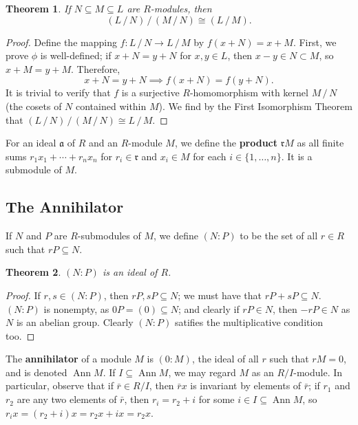 \documentclass[11pt]{article}
\newtheorem{theorem}{Theorem}
\newcommand{\Ann}{\operatorname{Ann}}
\begin{document}
\begin{adjustwidth}{1cm}{}
	\begin{theorem}
		If $N \subseteq M \subseteq L$ are $R$-modules, then
		\[
			(L \,/\, N) \,/\, (M \,/\, N) \cong (L \,/\, M).
		\]
	\end{theorem}
	\begin{proof}
		Define the mapping $f : L \,/\, N \to L \,/\, M$ by $f(x + N) = x + M$. First, we prove $\phi$ is well-defined; if $x + N = y + N$ for $x, y \in L$, then $x - y \in N \subset M$, so $x + M = y + M$. Therefore,
		\[
			x + N = y + N \implies f(x + N) = f(y + N).
		\]
		It is trivial to verify that $f$ is a surjective $R$-homomorphism with kernel $M \,/\, N$ (the cosets of $N$ contained within $M$). We find by the First Isomorphism Theorem that $(L \,/\, N) \,/\, (M \,/\, N) \cong L \,/\, M$.
	\end{proof}
\end{adjustwidth}

For an ideal $\mathfrak{a}$ of $R$ and an $R$-module $M$, we define the \textbf{product} $\mathfrak{r} M$ as all finite sums $r_{1}x_{1} + \cdots + r_{n}x_{n}$ for $r_{i} \in \mathfrak{r}$ and $x_{i} \in M$  for each $i \in \{ 1, \ldots, n \}$. It is a submodule of $M$.


\subsection{The Annihilator}

If $N$ and $P$ are $R$-submodules of $M$, we define $(N : P)$ to be the set of all $r \in R$ such that $rP \subseteq N$.

\begin{adjustwidth}{1cm}{}
	\begin{theorem}
		$(N : P)$ is an ideal of $R$.
	\end{theorem}
	\begin{proof}
		If $r, s \in (N : P)$, then $rP, sP \subseteq N$; we must have that $rP + sP \subseteq N$. $(N : P)$ is nonempty, as $0P = (0) \subseteq N$; and clearly if $rP \in N$, then $-rP \in N$ as $N$ is an abelian group. Clearly $(N : P)$ satifies the multiplicative condition too.
	\end{proof}
\end{adjustwidth}

The \textbf{annihilator} of a module $M$ is $(0 : M)$, the ideal of all $r$ such that $rM = 0$, and is denoted $\Ann M$. If $I \subseteq \Ann M$, we may regard $M$ as an $R / I$-module. In particular, observe that if $\bar{r} \in R / I$, then $\bar{r}x$ is invariant by elements of $\bar{r}$; if $r_{1}$ and $r_{2}$ are any two elements of $\bar{r}$, then $r_{i} = r_{2} + i$ for some $i \in I \subseteq \Ann M$, so $r_{i}x = (r_{2} + i)x = r_{2}x + ix = r_{2}x$.
\end{document}
